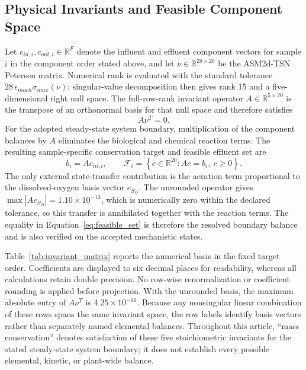\documentclass[a4paper,fleqn]{cas-sc}
\begin{document}
\subsection{Physical Invariants and Feasible Component Space}

Let $c_{in,i},c_{out,i}\in\mathbb{R}^{F}$ denote the influent and effluent component vectors for sample $i$ in the component order stated above, and let $\nu\in\mathbb{R}^{28\times20}$ be the ASM2d-TSN Petersen matrix. Numerical rank is evaluated with the standard tolerance $28\,\epsilon_{mach}\sigma_{max}(\nu)$; singular-value decomposition then gives rank 15 and a five-dimensional right null space. The full-row-rank invariant operator $A\in\mathbb{R}^{5\times20}$ is the transpose of an orthonormal basis for that null space and therefore satisfies
\begin{equation}
\label{eq:invariant_operator}
A\nu^T=0.
\end{equation}
For the adopted steady-state system boundary, multiplication of the component balances by $A$ eliminates the biological and chemical reaction terms. The resulting sample-specific conservation target and feasible effluent set are
\begin{equation}
\label{eq:feasible_set}
b_i=A c_{in,i},\qquad
\mathcal{F}_i=\left\{c\in\mathbb{R}^{20}:Ac=b_i,\ c\geq0\right\}.
\end{equation}
The only external state-transfer contribution is the aeration term proportional to the dissolved-oxygen basis vector $e_{S_O}$. The unrounded operator gives $\max|Ae_{S_O}|=1.10\times10^{-13}$, which is numerically zero within the declared tolerance, so this transfer is annihilated together with the reaction terms. The equality in Equation~\eqref{eq:feasible_set} is therefore the resolved boundary balance and is also verified on the accepted mechanistic states.

Table~\ref{tab:invariant_matrix} reports the numerical basis in the fixed target order. Coefficients are displayed to six decimal places for readability, whereas all calculations retain double precision. No row-wise renormalization or coefficient rounding is applied before projection. With the unrounded basis, the maximum absolute entry of $A\nu^T$ is $4.25\times10^{-16}$. Because any nonsingular linear combination of these rows spans the same invariant space, the row labels identify basis vectors rather than separately named elemental balances. Throughout this article, ``mass conservation'' denotes satisfaction of these five stoichiometric invariants for the stated steady-state system boundary; it does not establish every possible elemental, kinetic, or plant-wide balance.
\end{document}
